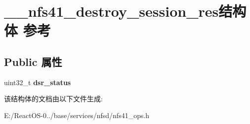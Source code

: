 \hypertarget{struct____nfs41__destroy__session__res}{}\section{\+\_\+\+\_\+nfs41\+\_\+destroy\+\_\+session\+\_\+res结构体 参考}
\label{struct____nfs41__destroy__session__res}
\subsection*{Public 属性}
\begin{DoxyCompactItemize}
\item 
\mbox{\label{struct____nfs41__destroy__session__res_ab69b16ddeb7bbc08fd518515538c20ec}} 
uint32\+\_\+t {\bfseries dsr\+\_\+status}
\end{DoxyCompactItemize}


该结构体的文档由以下文件生成\+:\begin{DoxyCompactItemize}
\item 
E\+:/\+React\+O\+S-\/0../base/services/nfsd/nfs41\+\_\+ops.\+h\end{DoxyCompactItemize}
